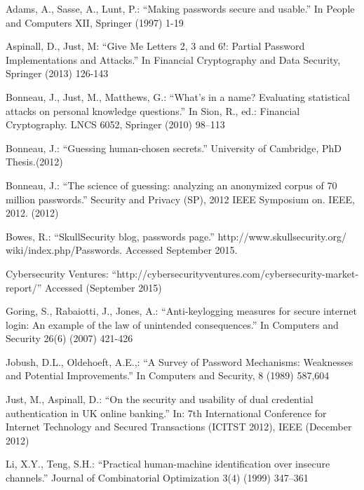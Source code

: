 \documentclass{llncs}
\begin{document}
\begin{thebibliography}{1}

Adams, A., Sasse, A., Lunt, P.: ``Making passwords secure and usable.''
In People and Computers XII, Springer (1997) 1-19

Aspinall, D., Just, M: ``Give Me Letters 2, 3 and 6!: Partial Password Implementations and Attacks.''
In Financial Cryptography and Data Security, Springer (2013) 126-143

 Bonneau, J., Just, M., Matthews, G.: ``What’s in a name? Evaluating statistical
attacks on personal knowledge questions.'' In Sion, R., ed.: Financial Cryptography.
LNCS 6052, Springer (2010) 98–113

 Bonneau, J.: ``Guessing human-chosen secrets.'' University of Cambridge, PhD Thesis.(2012)

 Bonneau, J.: ``The science of guessing: analyzing an anonymized corpus of 70 million passwords.'' Security and Privacy (SP), 2012 IEEE Symposium on. IEEE, 2012. (2012)

 Bowes, R.: ``SkullSecurity blog, passwords page.'' http://www.skullsecurity.org/
wiki/index.php/Passwords. Accessed September 2015.

Cybersecurity Ventures: ``http://cybersecurityventures.com/cybersecurity-market-report/''
Accessed (September 2015)

Goring, S., Rabaiotti, J., Jones, A.:
``Anti-keylogging measures for secure internet login:
An example of the law of unintended consequences.''
In Computers and Security 26(6) (2007) 421-426


Jobush, D.L., Oldehoeft, A.E.,: ``A Survey of Password Mechanisms: Weaknesses and Potential Improvements.''
In Computers and Security, 8 (1989) 587,604

 Just, M., Aspinall, D.: ``On the security and usability of dual credential authentication
in UK online banking.'' In: 7th International Conference for Internet Technology
and Secured Transactions (ICITST 2012), IEEE (December 2012)


Li, X.Y., Teng, S.H.: ``Practical human-machine identification over insecure channels.'' Journal of Combinatorial Optimization 3(4) (1999) 347–361



\end{thebibliography}
\end{document}
